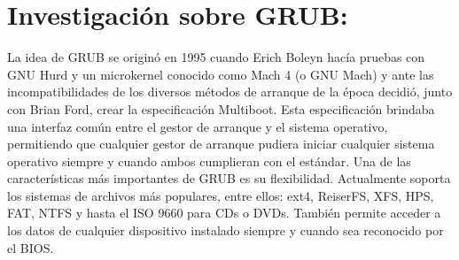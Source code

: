 \documentclass[a4paper, 11pt, oneside]{article}
\begin{document}
\section*{Investigación sobre GRUB:}

La idea de GRUB se originó en 1995 cuando Erich Boleyn hacía pruebas con GNU Hurd y un microkernel conocido como Mach 4 (o GNU Mach) y ante las incompatibilidades de los diversos métodos de arranque de la época decidió, junto con Brian Ford, crear la especificación Multiboot. Esta especificación brindaba una interfaz común entre el gestor de arranque y el sistema operativo, permitiendo que cualquier gestor de arranque pudiera iniciar cualquier sistema operativo siempre y cuando ambos cumplieran con el estándar. Una de las características más importantes de GRUB es su flexibilidad. Actualmente soporta los sistemas de archivos más populares, entre ellos: ext4, ReiserFS, XFS, HPS, FAT, NTFS y hasta el ISO 9660 para CDs o DVDs. También permite acceder a los datos de cualquier dispositivo instalado siempre y cuando sea reconocido por el BIOS.
\end{document}
